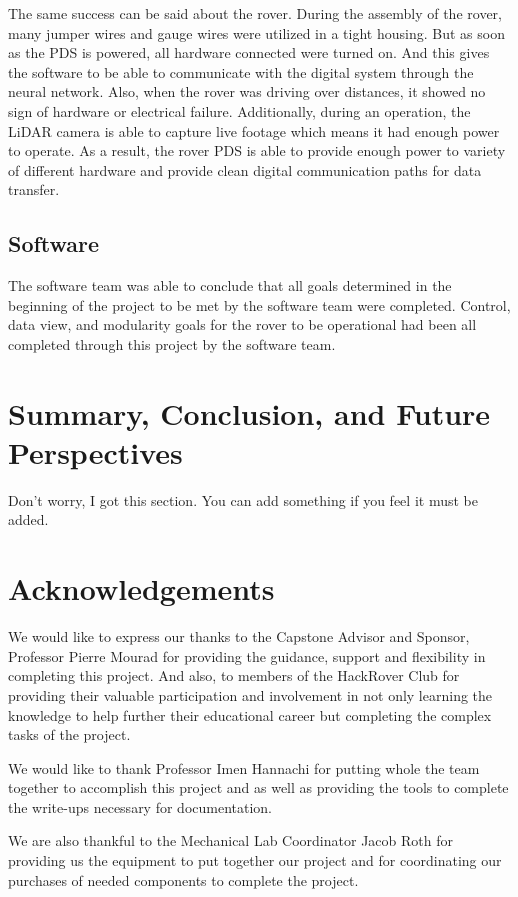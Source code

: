 \documentclass[a4paper, 10pt]{article}
\begin{document}
	The same success can be said about the rover. During the assembly of the rover, many jumper wires and gauge wires were utilized in a tight housing. But as soon as the PDS is powered, all hardware connected were turned on. And this gives the software to be able to communicate with the digital system through the neural network. Also, when the rover was driving over distances, it showed no sign of hardware or electrical failure. Additionally, during an operation, the LiDAR camera is able to capture live footage which means it had enough power to operate. As a result, the rover PDS is able to provide enough power to variety of different hardware and provide clean digital communication paths for data transfer.

    \subsection{Software}
    The software team was able to conclude that all goals determined in the beginning of the project to be met by the software team were completed. Control, data view, and modularity goals for the rover to be operational had been all completed through this project by the software team. 

\section{Summary, Conclusion, and Future Perspectives}
Don't worry, I got this section. You can add something if you feel it must be added.

\section{Acknowledgements}

	We would like to express our thanks to the Capstone Advisor and Sponsor, Professor Pierre Mourad for providing the guidance, support and flexibility in completing this project. And also, to members of the HackRover Club for providing their valuable participation and involvement in not only learning the knowledge to help further their educational career but completing the complex tasks of the project.
	
	We would like to thank Professor Imen Hannachi for putting whole the team together to accomplish this project and as well as providing the tools to complete the write-ups necessary for documentation.
	
	We are also thankful to the Mechanical Lab Coordinator Jacob Roth for providing us the equipment to put together our project and for coordinating our purchases of needed components to complete the project.
	
\end{document}
